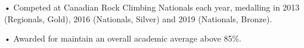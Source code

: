 \documentclass[]{rahulworld-resume}
\begin{document}
\begin{minipage}[t]{0.66\textwidth}
 
\descript{}
\noindent
\hspace{3em}%
\begin{minipage}{0.85\textwidth\vspace{2pt}}
• Competed at Canadian Rock Climbing Nationals each year, medalling in 2013 (Regionals, Gold), 2016 (Nationals, Silver) and 2019 (Nationals, Bronze). 
\end{minipage}
\sectionsep

 
\descript{}
\noindent
\hspace{3em}%
\begin{minipage}{0.85\textwidth\vspace{2pt}}
• Awarded for maintain an overall academic average above 85\%.
\end{minipage}
\end{minipage} 
\end{document}

